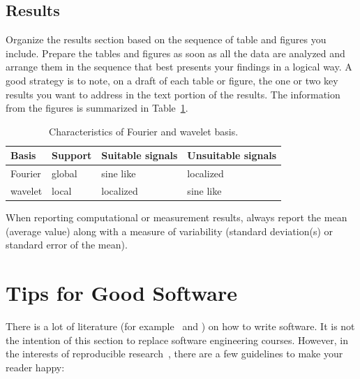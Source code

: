 \documentclass[10pt,conference,compsocconf]{IEEEtran}
\begin{document}
\subsection{Results}

Organize the results section based on the sequence of table and figures you include. Prepare the tables and figures as soon as all the data are analyzed and arrange them in the sequence that best presents your findings in a logical way. A good strategy is to note, on a draft of each table or figure, the one or two key results you want to address in the text portion of the results. The information from the figures is summarized in Table~\ref{tab:fourier-wavelet}.

\begin{table}[htbp]
  \centering
  \begin{tabular}[c]{|l||l|l|l|}
    \hline
    Basis&Support&Suitable signals&Unsuitable signals\\
    \hline
    Fourier&global&sine like&localized\\
    wavelet&local&localized&sine like\\
    \hline
  \end{tabular}
  \caption{Characteristics of Fourier and wavelet basis.}
  \label{tab:fourier-wavelet}
\end{table}

When reporting computational or measurement results, always report the mean (average value) along with a measure of variability (standard deviation(s) or standard error of the mean).


\section{Tips for Good Software}
\label{sec:tips-software}

There is a lot of literature (for example~\cite{hunt99pragmatic} and \cite{spolsky04software}) on how to write software. It is not the intention of this section to replace software engineering courses. However, in the interests of reproducible research~\cite{schwab00}, there are a few guidelines to make your reader happy:
\end{document}
